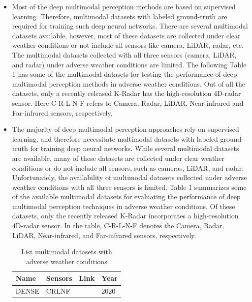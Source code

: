 \documentclass[rnd]{mas_proposal}
\begin{document}
\begin{itemize}
      \item Most of the deep multimodal perception methods are based on supervised learning. Therefore, multimodal datasets with labeled ground-truth are required for training such deep neural networks. There are several multimodal datasets available, however, most of these datasets are collected under clear weather conditions or not include all sensors like camera, LiDAR, radar, etc. The multimodal datasets collected with all three sensors (camera, LiDAR, and radar) under adverse weather conditions are limited. The following Table 1 has some of the multimodal datasets for testing the performance of deep multimodal perception methods in adverse weather conditions. Out of all the datasets, only a recently released K-Radar \cite{Paek2022Jun} has the high-resolution 4D-radar sensor. Here C-R-L-N-F refers to Camera, Radar, LiDAR, Near-infrared and Far-infrared sensors, respectively.
      \item The majority of deep multimodal perception approaches rely on supervised learning, and therefore necessitate multimodal datasets with labeled ground truth for training deep neural networks. While several multimodal datasets are available, many of these datasets are collected under clear weather conditions or do not include all sensors, such as cameras, LiDAR, and radar. Unfortunately, the availability of multimodal datasets collected under adverse weather conditions with all three sensors is limited. Table 1 summarizes some of the available multimodal datasets for evaluating the performance of deep multimodal perception techniques in adverse weather conditions. Of these datasets, only the recently released K-Radar \cite{Paek2022Jun} incorporates a high-resolution 4D-radar sensor. In the table, C-R-L-N-F denotes the Camera, Radar, LiDAR, Near-infrared, and Far-infrared sensors, respectively.
          \begin{table}[h]
              \centering
              \caption{List multimodal datasets with adverse weather conditions}
              \label{tab:my-table}
              \begin{tabular}{|l|l|l|l|}
                  \hline
                  \textbf{Name}       & \textbf{Sensors} & \textbf{Link}               & \textbf{Year} \\ \hline
                  DENSE               & CRLNF            & \cite{bijelic2020seeing}    & 2020          \\ \hline

\end{tabular}
\end{table}
\end{itemize}
\end{document}
